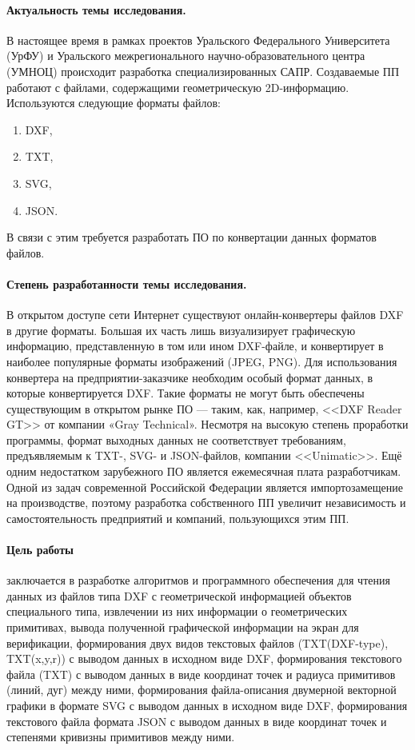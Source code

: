 \Introduction

\paragraph{Актуальность темы исследования.} В настоящее время в рамках проектов Уральского Федерального Университета (УрФУ) и Уральского межрегионального научно-образовательного центра (УМНОЦ) происходит разработка специализированных САПР. Создаваемые ПП работают с файлами, содержащими геометрическую 2D-информацию. Используются следующие форматы файлов:

\begin{enumerate}
	\item DXF,
	\item TXT,
	\item SVG,
	\item JSON.
\end{enumerate}

В связи с этим требуется разработать ПО по конвертации данных форматов файлов.

\paragraph{Степень разработанности темы исследования.} В открытом доступе сети Интернет существуют онлайн-конвертеры файлов DXF в другие форматы. Большая их часть лишь визуализирует графическую информацию, представленную в том или ином DXF-файле, и конвертирует в наиболее популярные форматы изображений (JPEG, PNG). Для использования конвертера на предприятии-заказчике необходим особый формат данных, в которые конвертируется DXF. Такие форматы не могут быть обеспечены существующим в открытом рынке ПО --- таким, как, например, <<DXF Reader GT>> от компании «Gray Technical». Несмотря на высокую степень проработки программы, формат выходных данных не соответствует требованиям, предъявляемым к TXT-, SVG- и JSON-файлов, компании <<Unimatic>>. Ещё одним недостатком зарубежного ПО является ежемесячная плата разработчикам. Одной из задач современной Российской Федерации является импортозамещение на производстве, поэтому разработка собственного ПП увеличит независимость и самостоятельность предприятий и компаний, пользующихся этим ПП.

\paragraph{Цель работы} заключается в разработке алгоритмов и программного обеспечения для чтения данных из файлов типа DXF с геометрической информацией объектов специального типа, извлечении из них информации о геометрических примитивах, вывода полученной графической информации на экран для верификации, формирования двух видов текстовых файлов (TXT(DXF-type), TXT(x,y,r)) с выводом данных в исходном виде DXF, формирования текстового файла (TXT) с выводом данных в виде координат точек и радиуса примитивов (линий, дуг) между ними, формирования файла-описания двумерной векторной графики в формате SVG с выводом данных в исходном виде DXF, формирования текстового файла формата JSON с выводом данных в виде координат точек и степенями кривизны примитивов между ними.

